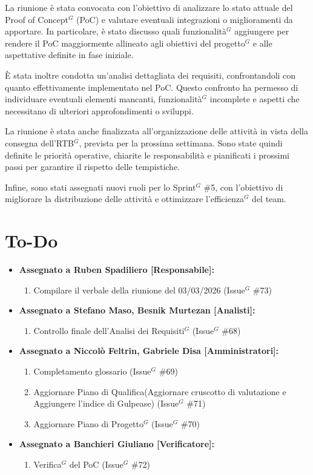 \documentclass[a4paper,10pt]{article}
\begin{document}
La riunione è stata convocata con l’obiettivo di analizzare lo stato attuale del Proof of Concept$^G$ (PoC) e valutare eventuali integrazioni o miglioramenti da apportare. In particolare, è stato discusso quali funzionalità$^G$ aggiungere per rendere il PoC maggiormente allineato agli obiettivi del progetto$^G$ e alle aspettative definite in fase iniziale.

È stata inoltre condotta un’analisi dettagliata dei requisiti, confrontandoli con quanto effettivamente implementato nel PoC. Questo confronto ha permesso di individuare eventuali elementi mancanti, funzionalità$^G$ incomplete e aspetti che necessitano di ulteriori approfondimenti o sviluppi.

La riunione è stata anche finalizzata all’organizzazione delle attività in vista della consegna dell’RTB$^G$, prevista per la prossima settimana. Sono state quindi definite le priorità operative, chiarite le responsabilità e pianificati i prossimi passi per garantire il rispetto delle tempistiche.

Infine, sono stati assegnati nuovi ruoli per lo Sprint$^G$ \#5, con l’obiettivo di migliorare la distribuzione delle attività e ottimizzare l’efficienza$^G$ del team.



\section*{To-Do}
\begin{itemize}
\item \textbf{Assegnato a Ruben Spadiliero [Responsabile]:}
    \begin{enumerate}
    \item Compilare il verbale della riunione del 03/03/2026 (Issue$^G$ \#73)
    \end{enumerate}
\item \textbf{Assegnato a Stefano Maso, Besnik Murtezan [Analisti]:}
    \begin{enumerate}
    \item Controllo finale dell'Analisi dei Requisiti$^G$ (Issue$^G$ \#68)
    \end{enumerate}
\item \textbf{Assegnato a Niccolò Feltrin, Gabriele Disa [Amministratori]:}
    \begin{enumerate}
    \item Completamento glossario (Issue$^G$ \#69)
    \item Aggiornare Piano di Qualifica(Aggiornare cruscotto di valutazione e
Aggiungere l'indice di Gulpease) (Issue$^G$ \#71)
    \item Aggiornare Piano di Progetto$^G$ (Issue$^G$ \#70)
    \end{enumerate}
\item \textbf{Assegnato a Banchieri Giuliano [Verificatore]:}
    \begin{enumerate}
    \item Verifica$^G$ del PoC (Issue$^G$ \#72)
    \end{enumerate}
\end{itemize}
\end{document}
